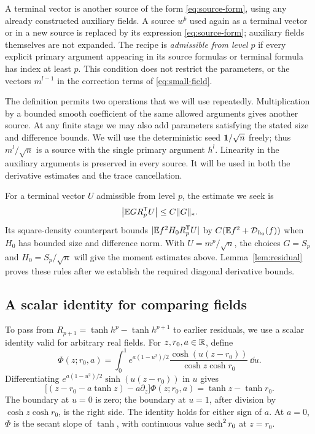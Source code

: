 \begin{definition}
A terminal vector is another source of the form \eqref{eq:source-form},
using any already constructed auxiliary fields.  A source $w^b$ used again
as a terminal vector or in a new source is replaced by its expression
\eqref{eq:source-form}; auxiliary fields themselves are not expanded.
The recipe is \emph{admissible from level $p$} if every explicit primary
argument appearing in its source formulas or terminal formula has index
at least $p$.  This condition does not restrict the parameters, or the
vectors $m^{l-1}$ in the correction terms of \eqref{eq:small-field}.
\end{definition}

The definition permits two operations that we will use repeatedly.
Multiplication by a bounded smooth coefficient of the same allowed
arguments gives another source. At any finite stage we may also add
parameters satisfying the stated size and difference bounds.  We will use
the deterministic seed $\mathbf 1/\sqrt n$ freely; thus $m^l/\sqrt n$ is a
source with the single primary argument $h^l$.  Linearity in the
auxiliary arguments is preserved in every source. It will be used in both
the derivative estimates and the trace cancellation.

For a terminal vector $U$ admissible from level $p$, the estimate we
seek is
\[
 \left|\mathbb E G R_p^{\mathsf T}U\right|\le C\lVert G\rVert_*.
\]
Its square-density counterpart bounds
$|\mathbb E f^2H_0R_p^{\mathsf T}U|$ by
$C(\mathbb E f^2+\mathcal D_{h_0}(f))$ when $H_0$ has bounded size and difference norm.
With $U=m^p/\sqrt n$, the choices $G=S_p$ and $H_0=S_p/\sqrt n$
will give the moment estimates above. Lemma~\ref{lem:residual} proves
these rules after we establish the required diagonal derivative bounds.

\subsection{A scalar identity for comparing fields}

To pass from $R_{p+1}=\tanh h^p-\tanh h^{p+1}$ to earlier residuals,
we use a scalar identity valid for arbitrary real fields. For
$z,r_0,a\in\mathbb R$, define
\begin{equation}
 \Phi(z;r_0,a)=\int_0^1 e^{a(1-u^2)/2}
       \frac{\cosh(u(z-r_0))}{\cosh z\cosh r_0}\,\dd u.
 \label{eq:phi}
\end{equation}
Differentiating $e^{a(1-u^2)/2}\sinh(u(z-r_0))$ in $u$ gives
\begin{equation}
 \bigl[(z-r_0-a\tanh z)-a\partial_z\bigr]\Phi(z;r_0,a)
       =\tanh z-\tanh r_0.
 \label{eq:phi-stein}
\end{equation}
The boundary at $u=0$ is zero; the boundary at $u=1$, after division
by $\cosh z\cosh r_0$, is the right side. The identity holds for either
sign of $a$. At $a=0$, $\Phi$ is the secant slope of $\tanh$, with
continuous value $\operatorname{sech}^2r_0$ at $z=r_0$.

